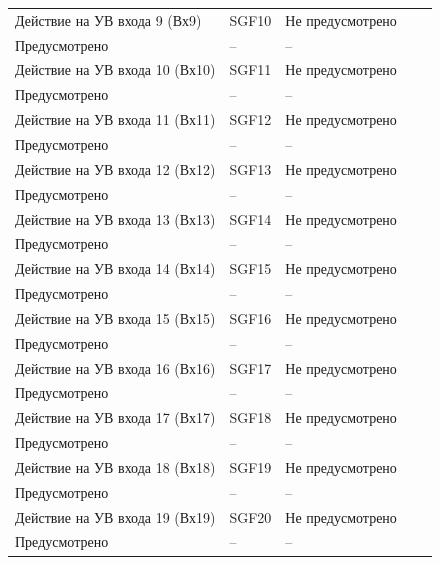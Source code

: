 \begin{longtable}{|>{\centering\arraybackslash}m{5.3cm}|>{\centering\arraybackslash}m{3.3cm}|>{\centering\arraybackslash}m{4.2cm}|>{\centering\arraybackslash}m{1.8cm}|>{\centering\arraybackslash}m{1cm}|}
\hline
\centering Действие на УВ входа 9 (Вх9)  & \centering SGF10 & \centering Не предусмотрено \\ Предусмотрено & \centering -- & \centering \arraybackslash -- \\
\hline
\centering Действие на УВ входа 10 (Вх10)  & \centering SGF11 & \centering Не предусмотрено \\ Предусмотрено & \centering -- & \centering \arraybackslash -- \\
\hline
\centering Действие на УВ входа 11 (Вх11)  & \centering SGF12 & \centering Не предусмотрено \\ Предусмотрено & \centering -- & \centering \arraybackslash -- \\
\hline
\centering Действие на УВ входа 12 (Вх12)  & \centering SGF13 & \centering Не предусмотрено \\ Предусмотрено & \centering -- & \centering \arraybackslash -- \\
\hline
\centering Действие на УВ входа 13 (Вх13)  & \centering SGF14 & \centering Не предусмотрено \\ Предусмотрено & \centering -- & \centering \arraybackslash -- \\
\hline
\centering Действие на УВ входа 14 (Вх14)  & \centering SGF15 & \centering Не предусмотрено \\ Предусмотрено & \centering -- & \centering \arraybackslash -- \\
\hline
\centering Действие на УВ входа 15 (Вх15)  & \centering SGF16 & \centering Не предусмотрено \\ Предусмотрено & \centering -- & \centering \arraybackslash -- \\
\hline
\centering Действие на УВ входа 16 (Вх16)  & \centering SGF17 & \centering Не предусмотрено \\ Предусмотрено & \centering -- & \centering \arraybackslash -- \\
\hline
\centering Действие на УВ входа 17 (Вх17)  & \centering SGF18 & \centering Не предусмотрено \\ Предусмотрено & \centering -- & \centering \arraybackslash -- \\
\hline
\centering Действие на УВ входа 18 (Вх18)  & \centering SGF19 & \centering Не предусмотрено \\ Предусмотрено & \centering -- & \centering \arraybackslash -- \\
\hline
\centering Действие на УВ входа 19 (Вх19)  & \centering SGF20 & \centering Не предусмотрено \\ Предусмотрено & \centering -- & \centering \arraybackslash -- \\

\end{longtable}
